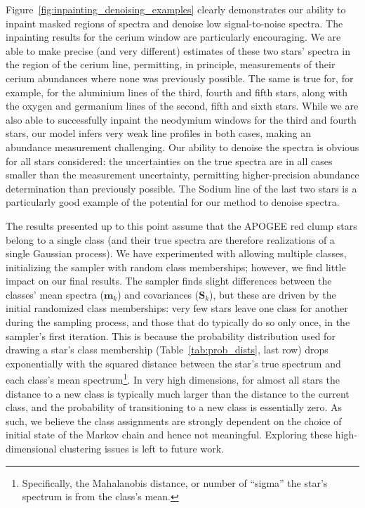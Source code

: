 \documentclass[a4paper,fleqn,usenatbib]{mnras}
\newcommand{\specmean}{{\bm m}}
\newcommand{\speccov}{{\bm S}}
\begin{document}
Figure~\ref{fig:inpainting_denoising_examples} clearly demonstrates our ability to inpaint masked regions of spectra and denoise low signal-to-noise spectra. The inpainting results for the cerium window are particularly encouraging. We are able to make precise (and very different) estimates of these two stars' spectra in the region of the cerium line, permitting, in principle, measurements of their cerium abundances where none was previously possible. The same is true for, for example, for the aluminium lines of the third, fourth and fifth stars, along with the oxygen and germanium lines of the second, fifth and sixth stars. While we are also able to successfully inpaint the neodymium windows for the third and fourth stars, our model infers very weak line profiles in both cases, making an abundance measurement challenging. Our ability to denoise the spectra is obvious for all stars considered: the uncertainties on the true spectra are in all cases smaller than the measurement uncertainty, permitting higher-precision abundance determination than previously possible. The Sodium line of the last two stars is a particularly good example of the potential for our method to denoise spectra.

The results presented up to this point assume that the APOGEE red clump stars belong to a single class (and their true spectra are therefore realizations of a single Gaussian process). We have experimented with allowing multiple classes, initializing the sampler with random class memberships; however, we find little impact on our final results. The sampler finds slight differences between the classes' mean spectra ($\specmean_k$) and covariances ($\speccov_k$), but these are driven by the initial randomized class memberships: very few stars leave one class for another during the sampling process, and those that do typically do so only once, in the sampler's first iteration. This is because the probability distribution used for drawing a star's class membership (Table~\ref{tab:prob_dists}, last row) drops exponentially with the squared distance between the star's true spectrum and each class's mean spectrum\footnote{Specifically, the Mahalanobis distance, or number of ``sigma'' the star's spectrum is from the class's mean.}. In very high dimensions, for almost all stars the distance to a new class is typically much larger than the distance to the current class, and the probability of transitioning to a new class is essentially zero. As such, we believe the class assignments are strongly dependent on the choice of initial state of the Markov chain and hence not meaningful. Exploring these high-dimensional clustering issues is left to future work. 
\end{document}
